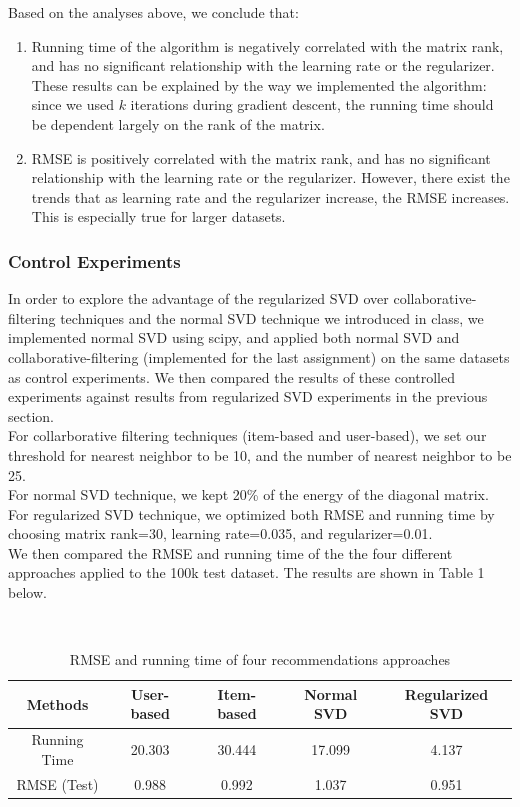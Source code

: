 \documentclass[12pt]{article}
\begin{document}
\noindent Based on the analyses above, we conclude that:
\begin{enumerate}
  \item Running time of the algorithm is negatively correlated with the matrix rank, and has no significant relationship with the learning rate or the regularizer. These results can be explained by the way we implemented the algorithm: since we used $k$ iterations during gradient descent, the running time should be dependent largely on the rank of the matrix.
  \item RMSE is positively correlated with the matrix rank, and has no significant relationship with the learning rate or the regularizer. However, there exist the trends that as learning rate and the regularizer increase, the RMSE increases. This is especially true for larger datasets.
\end{enumerate}

\subsubsection*{Control Experiments}

In order to explore the advantage of the regularized SVD over 
collaborative-filtering techniques and the normal SVD technique
we introduced in class, we implemented normal SVD using scipy, and
applied both normal SVD and collaborative-filtering (implemented for the
last assignment) on the same datasets as control experiments. We then
compared the results of these controlled experiments against results from 
regularized SVD experiments in the previous section.\\

\noindent For collarborative filtering techniques (item-based and user-based), we set our threshold for nearest neighbor to be 10, and the number of nearest neighbor to be 25.\\

\noindent For normal SVD technique, we kept 20\% of the energy of the diagonal matrix.\\

\noindent For regularized SVD technique, we optimized both RMSE and running time by choosing matrix rank=30, learning rate=0.035, and regularizer=0.01.\\

\noindent We then compared the RMSE and running time of the the four different approaches applied to the 100k test dataset. The results are shown in Table 1 below.

\begin{table}[H]
\caption{RMSE and running time of four recommendations approaches}
$      $
\centering
\begin{tabular}{c c c c c}
\hline\hline
Methods & User-based & Item-based & Normal SVD & Regularized SVD \\ [0.5ex]
\hline
Running Time & 20.303 & 30.444 & 17.099 & 4.137 \\
RMSE (Test) & 0.988 & 0.992 & 1.037 & 0.951 \\ [1ex]
\hline
\end{tabular}
\end{table}
\end{document}
